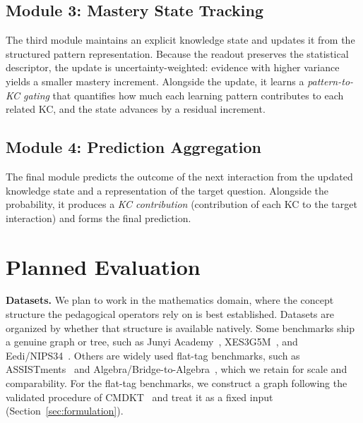 \documentclass[conference]{IEEEtran}
\begin{document}
\subsection{Module 3: Mastery State Tracking}
\label{sec:mst}

The third module maintains an explicit knowledge state and updates it from the structured pattern representation. Because the readout preserves the statistical descriptor, the update is uncertainty-weighted: evidence with higher variance yields a smaller mastery increment. Alongside the update, it learns a \emph{pattern-to-KC gating} that quantifies how much each learning pattern contributes to each related KC, and the state advances by a residual increment.

\subsection{Module 4: Prediction Aggregation}
\label{sec:pred}

The final module predicts the outcome of the next interaction from the updated knowledge state and a representation of the target question. Alongside the probability, it produces a \emph{KC contribution} (contribution of each KC to the target interaction) and forms the final prediction.

\section{Planned Evaluation}
\label{sec:eval}

\textbf{Datasets.} We plan to work in the mathematics domain, where the concept structure the pedagogical operators rely on is best established. Datasets are organized by whether that structure is available natively. Some benchmarks ship a genuine graph or tree, such as Junyi Academy~\cite{chang2015junyi}, XES3G5M~\cite{liu2023xes3g5m}, and Eedi/NIPS34~\cite{wang2021neurips}. Others are widely used flat-tag benchmarks, such as ASSISTments~\cite{feng2009assistments} and Algebra/Bridge-to-Algebra~\cite{stamper2010kddcup}, which we retain for scale and comparability. For the flat-tag benchmarks, we construct a graph following the validated procedure of CMDKT~\cite{xia2025cmdkt} and treat it as a fixed input (Section~\ref{sec:formulation}).
\end{document}
